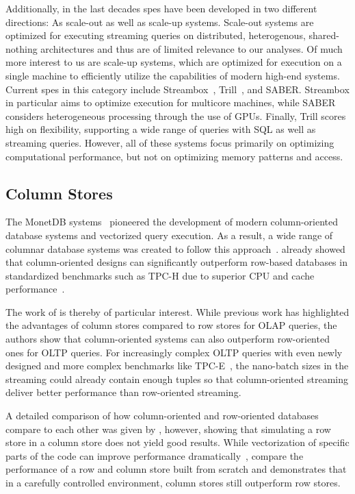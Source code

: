 Additionally, in the last decades \acp{spe} have been developed in two different directions: As scale-out as well as scale-up systems.
Scale-out systems are optimized for executing streaming queries on distributed, heterogenous, shared-nothing architectures and thus are of limited relevance to our analyses. 
Of much more interest to us are scale-up systems, which are optimized for execution on a single machine to efficiently utilize the capabilities of modern high-end systems.
Current \acp{spe} in this category include Streambox~\cite{DBLP:conf/usenix/MiaoPJPML17}, Trill~\cite{DBLP:journals/pvldb/ChandramouliGBDPTW14}, and SABER.
Streambox in particular aims to optimize execution for multicore machines, while SABER considers heterogeneous processing through the use of GPUs.
Finally, Trill scores high on flexibility, supporting a wide range of queries with SQL as well as streaming queries.
However, all of these systems focus primarily on optimizing computational performance, but not on optimizing memory patterns and access.

\subsection{Column Stores}

The MonetDB systems~\cite{DBLP:conf/cidr/BonczZN05,DBLP:journals/vldb/BonczK99} pioneered the development of modern column-oriented database systems and vectorized query execution.
As a result, a wide range of columnar database systems was created to follow this approach~\cite{DBLP:conf/sigmod/SikkaFLCPB12,DBLP:conf/vldb/StonebrakerABCCFLLMOORTZ05,DBLP:conf/icde/ZukowskiWB12,DBLP:journals/pvldb/GrundKPZCM10}.
\citet{DBLP:journals/pvldb/LiarouIMK12} already showed that column-oriented designs can significantly outperform row-based databases in standardized benchmarks such as TPC-H due to superior CPU and cache performance~\cite{DBLP:conf/sigmod/AbadiMH08}.

The work of \citet{DBLP:conf/sigmod/SikkaFLCPB12} is thereby of particular interest.
While previous work has highlighted the advantages of column stores compared to row stores for OLAP queries, the authors show that column-oriented systems can also outperform row-oriented ones for OLTP queries.
For increasingly complex OLTP queries with even newly designed and more complex benchmarks like TPC-E~\cite{DBLP:conf/sigmod/SikkaFLCPB12,DBLP:conf/edbt/TozunPKJA13,tpce}, the nano-batch sizes in the streaming could already contain enough tuples so that column-oriented streaming deliver better performance than row-oriented streaming.

A detailed comparison of how column-oriented and row-oriented databases compare to each other was given by \citet{DBLP:conf/sigmod/AbadiMH08}, however, showing that simulating a row store in a column store does not yield good results.
While vectorization of specific parts of the code can improve performance dramatically~\cite{DBLP:journals/pvldb/KerstenLKNPB18}, \citet{DBLP:conf/vldb/HarizopoulosLAM06} compare the performance of a row and column store built from scratch and demonstrates that in a carefully controlled environment, column stores still outperform row stores.